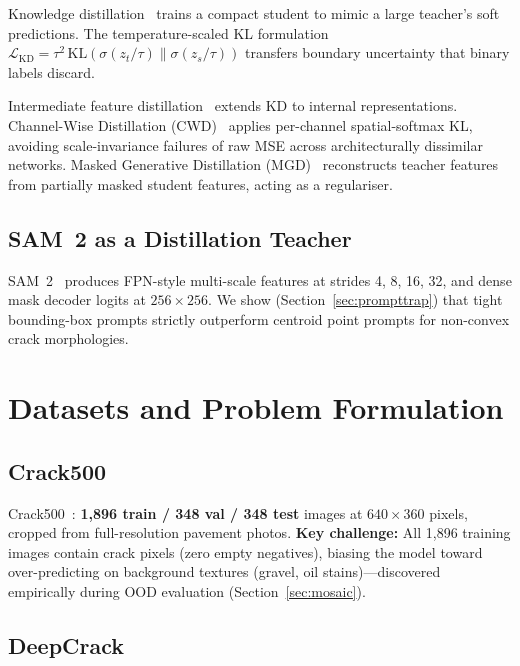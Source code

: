\documentclass[12pt,a4paper]{article}
\begin{document}
Knowledge distillation~\cite{hinton2015distilling} trains a compact student to
mimic a large teacher's soft predictions.
The temperature-scaled KL formulation
$\mathcal{L}_\text{KD} = \tau^2\,\mathrm{KL}(\sigma(z_t/\tau)\|\sigma(z_s/\tau))$
transfers boundary uncertainty that binary labels discard.

Intermediate feature distillation~\cite{romero2015fitnets,zagoruyko2017at}
extends KD to internal representations.
Channel-Wise Distillation (CWD)~\cite{shu2021cwd} applies per-channel
spatial-softmax KL, avoiding scale-invariance failures of raw MSE across
architecturally dissimilar networks.
Masked Generative Distillation (MGD)~\cite{yang2022mgd} reconstructs teacher
features from partially masked student features, acting as a regulariser.

\subsection{SAM~2 as a Distillation Teacher}

SAM~2~\cite{ravi2024sam2} produces FPN-style multi-scale features at strides
4, 8, 16, 32, and dense mask decoder logits at $256\times256$.
We show (Section~\ref{sec:prompttrap}) that tight bounding-box prompts strictly
outperform centroid point prompts for non-convex crack morphologies.

\section{Datasets and Problem Formulation}
\label{sec:data}

\subsection{Crack500}

Crack500~\cite{zhang2016crack500}: \textbf{1,896 train / 348 val / 348 test}
images at $640\times360$ pixels, cropped from full-resolution pavement photos.
\textbf{Key challenge:} All 1,896 training images contain crack pixels (zero
empty negatives), biasing the model toward over-predicting on background
textures (gravel, oil stains)---discovered empirically during OOD evaluation
(Section~\ref{sec:mosaic}).

\subsection{DeepCrack}
\end{document}
